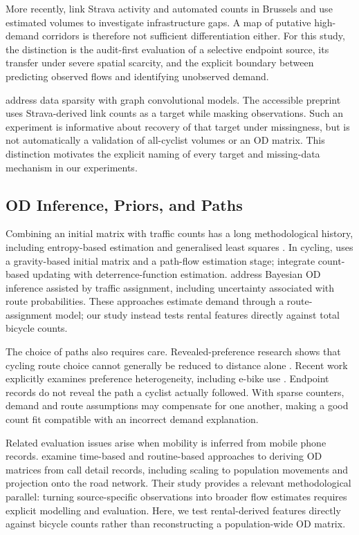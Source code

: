 \documentclass{interact}
\begin{document}
More recently, \citet{tori2026} link Strava activity and automated counts in Brussels and use estimated volumes to investigate infrastructure gaps. A map of putative high-demand corridors is therefore not sufficient differentiation either. For this study, the distinction is the audit-first evaluation of a selective endpoint source, its transfer under severe spatial scarcity, and the explicit boundary between predicting observed flows and identifying unobserved demand.

\citet{gupta2025} address data sparsity with graph convolutional models. The accessible preprint \citep{guptaPreprint} uses Strava-derived link counts as a target while masking observations. Such an experiment is informative about recovery of that target under missingness, but is not automatically a validation of all-cyclist volumes or an OD matrix. This distinction motivates the explicit naming of every target and missing-data mechanism in our experiments.

\subsection{OD Inference, Priors, and Paths}
Combining an initial matrix with traffic counts has a long methodological history, including entropy-based estimation \citep{vanzuylen1980} and generalised least squares \citep{cascetta1984}. In cycling, \citet{ryu2020} uses a gravity-based initial matrix and a path-flow estimation stage; \citet{melo2023} integrate count-based updating with deterrence-function estimation. \citet{hazelton2024} address Bayesian OD inference assisted by traffic assignment, including uncertainty associated with route probabilities. These approaches estimate demand through a route-assignment model; our study instead tests rental features directly against total bicycle counts.

The choice of paths also requires care. Revealed-preference research shows that cycling route choice cannot generally be reduced to distance alone \citep{broach2012}. Recent work explicitly examines preference heterogeneity, including e-bike use \citep{lilas2025}. Endpoint records do not reveal the path a cyclist actually followed. With sparse counters, demand and route assumptions may compensate for one another, making a good count fit compatible with an incorrect demand explanation.

Related evaluation issues arise when mobility is inferred from mobile phone records. \citet{mamei2019od} examine time-based and routine-based approaches to deriving OD matrices from call detail records, including scaling to population movements and projection onto the road network. Their study provides a relevant methodological parallel: turning source-specific observations into broader flow estimates requires explicit modelling and evaluation. Here, we test rental-derived features directly against bicycle counts rather than reconstructing a population-wide OD matrix.
\end{document}
